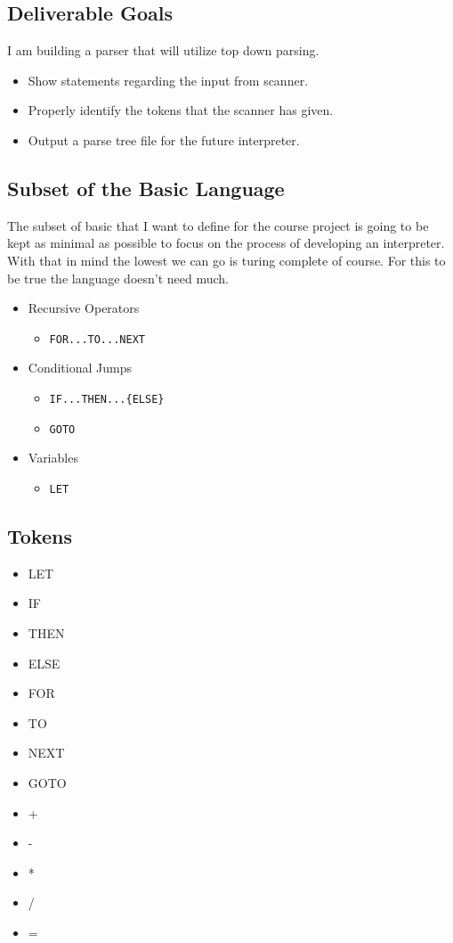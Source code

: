 \documentclass{report}
\begin{document}
\subsection*{Deliverable Goals}
I am building a parser that will utilize top down parsing.
\begin{itemize}
	\item Show statements regarding the input from scanner.
	\item Properly identify the tokens that the scanner has given.
	\item Output a parse tree file for the future interpreter.
\end{itemize}

\subsection*{Subset of the Basic Language}
The subset of basic that I want to define for the course project is going to be kept as minimal as possible to focus on the process of developing an interpreter. 
With that in mind the lowest we can go is turing complete of course. 
For this to be true the language doesn't need much. 

\begin{multicols}{2}
\begin{itemize}
	\item Recursive Operators
		\begin{itemize}
			\item \texttt{FOR...TO...NEXT}
		\end{itemize}
	\item Conditional Jumps 
		\begin{itemize}
			\item \texttt{IF...THEN...\{ELSE\}}
			\item \texttt{GOTO}
		\end{itemize}	
	\item Variables
		\begin{itemize}
			\item \texttt{LET}
		\end{itemize}
\end{itemize}
\columnbreak
\subsection*{Tokens}
\begin{itemize}
	\item LET
	\item IF 
	\item THEN 
	\item ELSE 
	\item FOR 
	\item TO 
	\item NEXT 
	\item GOTO
	\item +
	\item -
	\item *
	\item /
	\item =
\end{itemize}

\end{multicols}
\end{document}

